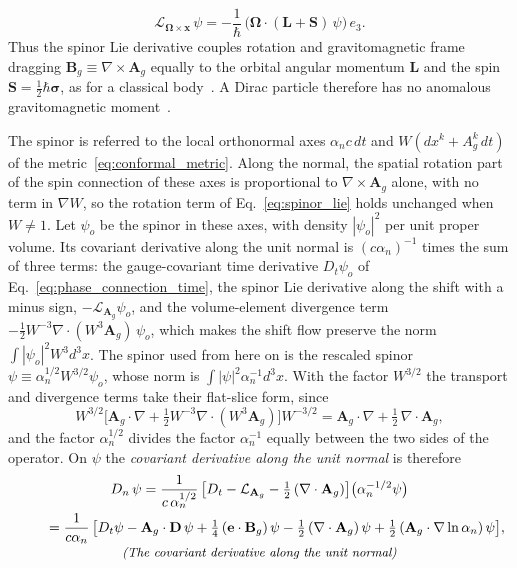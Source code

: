 \documentclass[aps,prd,onecolumn,tightenlines,nofootinbib,notitlepage,11pt,floatfix]{revtex4-2}
\theoremstyle{indentedtheorem}
\begin{document}
\begin{equation}
    \mathcal{L}_{\boldsymbol{\Omega}\times\mathbf{x}}\,\psi = -\frac{1}{\hbar}\,\big(\boldsymbol{\Omega}\cdot(\mathbf{L}+\mathbf{S})\,\psi\big)\,e_3 .
    \label{eq:lie_rigid_rotation}
\end{equation}
Thus the spinor Lie derivative couples rotation and gravitomagnetic frame dragging $\mathbf{B}_g \equiv \nabla\times\mathbf{A}_g$ equally to the orbital angular momentum $\mathbf{L}$ and the spin $\mathbf{S}=\tfrac{1}{2}\hbar\boldsymbol{\sigma}$, as for a classical body~\citep{HehlNi1990Inertial}. A Dirac particle therefore has no anomalous gravitomagnetic moment~\citep{KobzarevOkun1963Gravitational}.

The spinor is referred to the local orthonormal axes $\alpha_nc\,dt$ and $W(dx^k+A_g^k\,dt)$ of the metric~\eqref{eq:conformal_metric}. Along the normal, the spatial rotation part of the spin connection of these axes is proportional to $\nabla\times\mathbf{A}_g$ alone, with no term in $\nabla W$, so the rotation term of Eq.~\eqref{eq:spinor_lie} holds unchanged when $W\neq1$. Let $\psi_o$ be the spinor in these axes, with density $|\psi_o|^2$ per unit proper volume. Its covariant derivative along the unit normal is $(c\alpha_n)^{-1}$ times the sum of three terms: the gauge-covariant time derivative $D_t\psi_o$ of Eq.~\eqref{eq:phase_connection_time}, the spinor Lie derivative along the shift with a minus sign, $-\mathcal{L}_{\mathbf{A}_g}\psi_o$, and the volume-element divergence term $-\tfrac{1}{2}W^{-3}\nabla\cdot(W^3\mathbf{A}_g)\,\psi_o$, which makes the shift flow preserve the norm $\int|\psi_o|^2W^3d^3x$. The spinor used from here on is the rescaled spinor $\psi \equiv \alpha_n^{1/2}W^{3/2}\psi_o$, whose norm is $\int|\psi|^2\alpha_n^{-1}d^3x$. With the factor $W^{3/2}$ the transport and divergence terms take their flat-slice form, since
\begin{equation*}
    W^{3/2}\big[\mathbf{A}_g\cdot\nabla + \tfrac{1}{2}W^{-3}\nabla\cdot(W^3\mathbf{A}_g)\big]W^{-3/2} = \mathbf{A}_g\cdot\nabla + \tfrac{1}{2}\,\nabla\cdot\mathbf{A}_g ,
\end{equation*}
and the factor $\alpha_n^{1/2}$ divides the factor $\alpha_n^{-1}$ equally between the two sides of the operator. On $\psi$ the \emph{covariant derivative along the unit normal} is therefore
\begin{equation}
    \begin{gathered}
    D_n\,\psi = \frac{1}{c\,\alpha_n^{1/2}}\,\big[D_t - \mathcal{L}_{\mathbf{A}_g} - \tfrac{1}{2}\,(\nabla\cdot\mathbf{A}_g)\big]\big(\alpha_n^{-1/2}\psi\big) \\
    \phantom{D_n\,\psi} = \frac{1}{c\alpha_n}\,\big[D_t\psi - \mathbf{A}_g\cdot\mathbf{D}\,\psi + \tfrac{1}{4}\,(\mathbf{e}\cdot\mathbf{B}_g)\,\psi - \tfrac{1}{2}\,(\nabla\cdot\mathbf{A}_g)\,\psi + \tfrac{1}{2}\,(\mathbf{A}_g\cdot\nabla\ln\alpha_n)\,\psi\big] , \\[-3pt]
    \text{\small\itshape (The covariant derivative along the unit normal)}
    \end{gathered}
    \label{eq:normal_derivative}
\end{equation}
\end{document}
